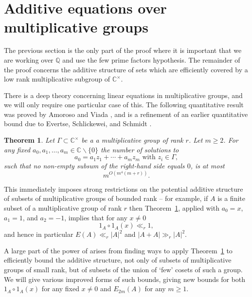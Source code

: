 \documentclass{amsart}
\renewcommand{\geq}{\geqslant}
\newcommand{\bbq}{\mathbb{Q}}
\newcommand{\bbc}{\mathbb{C}}
\newcommand{\abs}[1]{\left\lvert #1\right\rvert}
\newtheorem{theorem}{Theorem}
\theoremstyle{definition}
\begin{document}
\section{Additive equations over multiplicative groups}\label{sec-add}

The previous section is the only part of the proof where it is important that we are working over $\bbq$ and use the few prime factors hypothesis. The remainder of the proof concerns the additive structure of sets which are efficiently covered by a low rank multiplicative subgroup of $\bbc^\times$.

There is a deep theory concerning linear equations in multiplicative groups, and we will only require one particular case of this. The following quantitative result was proved by Amoroso and Viada \cite[Theorem 6.2]{AmVi09}, and is a refinement of an earlier quantitative bound due to Evertse, Schlickewei, and Schmidt \cite{ESS02}. 
\begin{theorem}\label{th-subspace}
Let $\Gamma\subset \bbc^\times$ be a a multiplicative group of rank $r$. Let $m\geq 2$. For any fixed $a_0,a_1,\ldots,a_m\in \bbc\backslash \{0\}$ the number of solutions to
\[a_0=a_1z_1+\cdots+a_mz_m\textrm{ with }z_i\in \Gamma,\]
such that no non-empty subsum of the right-hand side equals $0$, is at most
\[m^{O(m^4(m+r))}.\]
\end{theorem}

This immediately imposes strong restrictions on the potential additive structure of subsets of multiplicative groups of bounded rank -- for example, if $A$ is a finite subset of a multiplicative group of rank $r$ then Theorem~\ref{th-subspace}, applied with $a_0=x$, $a_1=1$, and $a_2=-1$, implies that for any $x\neq 0$
\[1_A\circ 1_A(x) \ll_r 1,\]
and hence in particular $E(A) \ll_r \abs{A}^2$ and $\abs{A+A}\gg_r \abs{A}^2$.

A large part of the power of \cite{HRSZ25} arises from finding ways to apply Theorem~\ref{th-subspace} to efficiently bound the additive structure, not only of subsets of multiplicative groups of small rank, but of subsets of the union of `few' cosets of such a group. We will give various improved forms of such bounds, giving new bounds for both $1_A\circ 1_A(x)$ for any fixed $x\neq 0$ and $E_{2m}(A)$ for any $m\geq 1$.
\end{document}
